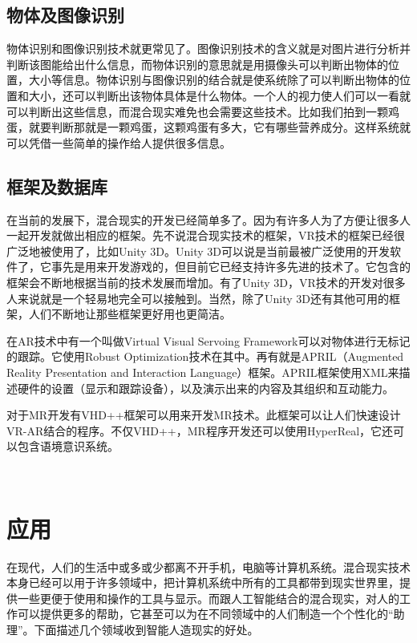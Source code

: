 \documentclass{llncs}
\begin{document}
\subsection{物体及图像识别}
物体识别和图像识别技术\cite{papageorgiou1998general}就更常见了。图像识别技术的含义就是对图片进行分析并判断该图能给出什么信息，而物体识别的意思就是用摄像头可以判断出物体的位置，大小等信息。物体识别与图像识别的结合就是使系统除了可以判断出物体的位置和大小，还可以判断出该物体具体是什么物体。一个人的视力使人们可以一看就可以判断出这些信息，而混合现实难免也会需要这些技术。比如我们拍到一颗鸡蛋，就要判断那就是一颗鸡蛋，这颗鸡蛋有多大，它有哪些营养成分。这样系统就可以凭借一些简单的操作给人提供很多信息。

\subsection{框架及数据库}
在当前的发展下，混合现实的开发已经简单多了。因为有许多人为了方便让很多人一起开发就做出相应的框架。先不说混合现实技术的框架，VR技术的框架已经很广泛地被使用了，比如Unity 3D。Unity 3D可以说是当前最被广泛使用的开发软件了，它事先是用来开发游戏的，但目前它已经支持许多先进的技术了。它包含的框架会不断地根据当前的技术发展而增加。有了Unity 3D，VR技术的开发对很多人来说就是一个轻易地完全可以接触到\cite{wang2010new}。当然，除了Unity 3D还有其他可用的框架，人们不断地让那些框架更好用也更简洁\cite{DBLP:conf/dimea/WetzelLWJ08}。

在AR技术中有一个叫做Virtual Visual Servoing Framework可以对物体进行无标记的跟踪\cite{DBLP:journals/tvcg/ComportMPC06}。它使用Robust Optimization技术在其中。再有就是APRIL（Augmented Reality Presentation and Interaction Language）框架。APRIL框架使用XML来描述硬件的设置（显示和跟踪设备），以及演示出来的内容及其组织和互动能力\cite{DBLP:conf/vr/LedermannS05}。

对于MR开发有VHD++框架可以用来开发MR技术。此框架可以让人们快速设计VR-AR结合的程序\cite{DBLP:conf/cw/EggesPM06}。不仅VHD++，MR程序开发还可以使用HyperReal，它还可以包含语境意识系统\cite{thomas2012survey}。

\

\section{应用}
在现代，人们的生活中或多或少都离不开手机，电脑等计算机系统。混合现实技术本身已经可以用于许多领域中，把计算机系统中所有的工具都带到现实世界里，提供一些更便于使用和操作的工具与显示。而跟人工智能结合的混合现实，对人的工作可以提供更多的帮助，它甚至可以为在不同领域中的人们制造一个个性化的“助理”。下面描述几个领域收到智能人造现实的好处。
\end{document}
